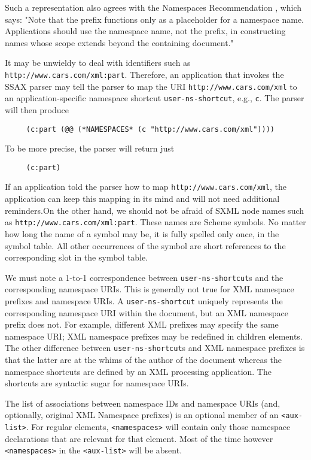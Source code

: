 \documentclass[10pt]{article}
\begin{document}
Such a representation also agrees with the Namespaces Recommendation \cite{XML-Namespaces}, which says: "Note that the prefix
functions only as a placeholder for a namespace name. Applications
should use the namespace name, not the prefix, in constructing names
whose scope extends beyond the containing document."

It may be unwieldy to deal with identifiers such as \texttt{http://www.cars.com/xml:part}. Therefore, an application that
invokes the SSAX parser may tell the parser to map the URI \texttt{http://www.cars.com/xml} to an application-specific namespace shortcut \texttt{user-ns-shortcut}, e.g., \texttt{c}. The parser will then produce\begin{verbatim}
     (c:part (@@ (*NAMESPACES* (c "http://www.cars.com/xml"))))
\end{verbatim}
To be more precise, the parser will return just\begin{verbatim}
     (c:part)
\end{verbatim}
If an application told the parser how to map \texttt{http://www.cars.com/xml}, the application can keep this mapping in
its mind and will not need additional reminders.On the other hand, we should not be afraid of SXML node
names such as \texttt{http://www.cars.com/xml:part}. These names
are Scheme symbols. No matter how long the name of a symbol may be, it
is fully spelled only once, in the symbol table. All other occurrences
of the symbol are short references to the corresponding slot in
the symbol table.



We must note a 1-to-1 correspondence between \texttt{user-ns-shortcut}s and the corresponding namespace URIs. This is generally not true
for XML namespace prefixes and namespace URIs. A \texttt{user-ns-shortcut} uniquely represents the corresponding namespace
URI within the document, but an XML namespace prefix does not. For
example, different XML prefixes may specify the same namespace
URI; XML namespace prefixes may be redefined in children elements. The
other difference between \texttt{user-ns-shortcut}s and
XML namespace prefixes is that the latter are at the whims of the author
of the document whereas the namespace shortcuts are defined by an
XML processing application. The shortcuts are syntactic sugar for namespace URIs.

The list of associations between namespace IDs and namespace URIs (and, optionally, original XML Namespace prefixes) is an optional member of an \texttt{<aux-list>}. For regular elements, \texttt{<namespaces>} will contain only those namespace declarations that are relevant for that element. Most of the time however \texttt{<namespaces>} in the \texttt{<aux-list>} will be absent.
\end{document}
